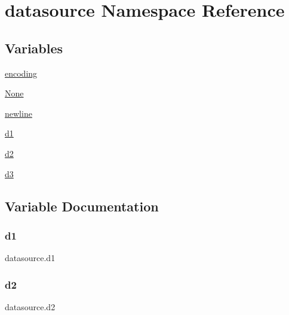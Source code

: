 \hypertarget{namespacedatasource}{}\section{datasource Namespace Reference}
\label{namespacedatasource}
\subsection*{Variables}
\begin{DoxyCompactItemize}
\item 
\hyperlink{namespacedatasource_a3b4f01e67363aee39379647ebc7eedf0}{encoding}
\item 
\hyperlink{namespacedatasource_a9c849844c82f5047029f03bf21be37ce}{None}
\item 
\hyperlink{namespacedatasource_aafc395c6c9a73fed8a512466dfa2401a}{newline}
\item 
\hyperlink{namespacedatasource_a5dadc246a474f1fe3157b04b726690bb}{d1}
\item 
\hyperlink{namespacedatasource_aefccda80717f85fced2b397c97f82269}{d2}
\item 
\hyperlink{namespacedatasource_a104cde857d788382b3877cf109835da4}{d3}
\end{DoxyCompactItemize}


\subsection{Variable Documentation}
\mbox{\label{namespacedatasource_a5dadc246a474f1fe3157b04b726690bb}} 
\subsubsection{\texorpdfstring{d1}{d1}}
{\footnotesize\ttfamily datasource.\+d1}

\mbox{\label{namespacedatasource_aefccda80717f85fced2b397c97f82269}} 
\subsubsection{\texorpdfstring{d2}{d2}}
{\footnotesize\ttfamily datasource.\+d2}

\mbox{\label{namespacedatasource_a104cde857d788382b3877cf109835da4}} 
